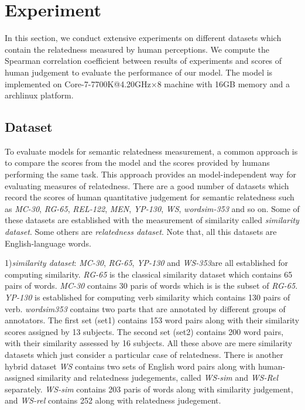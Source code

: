 \section{Experiment}
In this section, we conduct extensive experiments on different datasets which
contain the relatedness measured by human perceptions. We compute the Spearman
correlation coefficient between results of experiments and scores of human judgement
to evaluate the performance of our model. The model is implemented on 
Core-7-7700K@4.20GHz$\times$8 machine with 16GB memory and a archlinux platform.
 
\subsection{Dataset}
To evaluate models for semantic relatedness measurement, a common approach is to compare
the scores from the model and the scores provided by humans performing the same task.
This approach provides an model-independent way for evaluating measures of relatedness.
There are a good number of datasets which record the scores of human quantitative judgement
for semantic relatedness such as \emph{MC-30}\cite{MC30/Miller02}, \emph{RG-65}\cite{RG65/RubensteinG65}, 
\emph{REL-122}\cite{acl/SzumlanskiGS13}, \emph{MEN}\cite{MEN/BruniTB14}, 
\emph{YP-130}\cite{YP130/Yang06verbsimilarity}, \emph{WS}\cite{ws/AgirreAHKPS09},
\emph{wordsim-353}\cite{wordsim353/FinkelsteinGMRSWR02}
and so on. Some of these datasets are established with the measurement of 
similarity called \emph{similarity dataset}. Some others are \emph{relatedness dataset}.
Note that, all this datasets are English-language words.

1)\emph{similarity dataset}:
\emph{MC-30}, \emph{RG-65}, \emph{YP-130} and \emph{WS-353}are all established for computing similarity.
\emph{RG-65} is the classical similarity dataset which contains 65 pairs of words.
\emph{MC-30} contains 30 paris of words which is is the subset of \emph{RG-65}.
\emph{YP-130} is established for computing verb similarity which contains 130 pairs of verb.
\emph{wordsim353} contains two parts that are annotated by different groups of annotators.
The first set (set1) contains 153 word pairs along with their similarity scores assigned by 13 subjects. 
The second set (set2) contains 200 word pairs, with their similarity assessed by 16 subjects.
All these above are mere similarity datasets which just consider a particular case of relatedness.
There is another hybrid dataset \emph{WS} contains two sets of English word pairs along
with human-assigned similarity and relatedness judegements, called \emph{WS-sim} and \emph{WS-Rel} separately.
\emph{WS-sim} contains 203 paris of words along with similarity judgement,
and \emph{WS-rel} contains 252 along with relatedness judegement.

